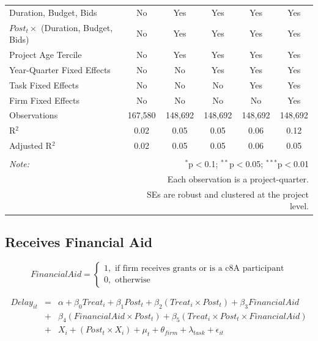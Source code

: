 \documentclass[
]{article}
\begin{document}
\begin{table}[H]
\begin{tabular}{@{\extracolsep{-2pt}}lccccc}
Duration, Budget, Bids & No & Yes & Yes & Yes & Yes \\ 
$Post_t \times $  (Duration, Budget, Bids) & No & Yes & Yes & Yes & Yes \\ 
Project Age Tercile & No & Yes & Yes & Yes & Yes \\ 
Year-Quarter Fixed Effects & No & No & Yes & Yes & Yes \\ 
Task Fixed Effects & No & No & No & Yes & Yes \\ 
Firm Fixed Effects & No & No & No & No & Yes \\ 
Observations & 167,580 & 148,692 & 148,692 & 148,692 & 148,692 \\ 
R$^{2}$ & 0.02 & 0.05 & 0.05 & 0.06 & 0.12 \\ 
Adjusted R$^{2}$ & 0.02 & 0.05 & 0.05 & 0.06 & 0.05 \\ 
\hline 
\hline \\[-1.8ex] 
\textit{Note:}  & \multicolumn{5}{r}{$^{*}$p$<$0.1; $^{**}$p$<$0.05; $^{***}$p$<$0.01} \\ 
 & \multicolumn{5}{r}{Each observation is a project-quarter.} \\ 
 & \multicolumn{5}{r}{SEs are robust and clustered at the project level.} \\ 
\end{tabular} 
\end{table}

\hypertarget{receives-financial-aid}{%
\subsection{Receives Financial Aid}\label{receives-financial-aid}}

\[ FinancialAid = \begin{cases} 1, \text{ if firm receives grants or is a c8A participant}\\
0, \text{ otherwise} \end{cases}\]

\[ \begin{aligned}
Delay_{it} &=& \alpha+\beta_0 Treat_i + \beta_1 Post_t + \beta_2 (Treat_i \times Post_t) +\beta_3 FinancialAid \\
&+& \beta_4 (FinancialAid \times Post_t) + \beta_5 (Treat_i \times Post_t \times FinancialAid) \\ 
&+&X_i + (Post_t \times X_i) + \mu_t + \theta_{firm} + \lambda_{task}+ \epsilon_{it}
\end{aligned}\]
\end{document}
